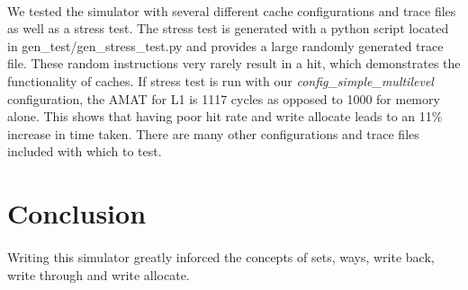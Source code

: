 \documentclass[11pt]{article}
\begin{document}
\paragraph{}
We tested the simulator with several different cache configurations and trace files as well as a stress test. The stress test is generated with a python script located in gen\_test/gen\_stress\_test.py and provides a large randomly generated trace file. These random instructions very rarely result in a hit, which demonstrates the functionality of caches. If stress test is run with our \textit{config\_simple\_multilevel} configuration, the AMAT for L1 is 1117 cycles as opposed to 1000 for memory alone. This shows that having poor hit rate and write allocate leads to an 11\% increase in time taken. There are many other configurations and trace files included with which to test. 

\section{Conclusion}
\paragraph{}
Writing this simulator greatly inforced the concepts of sets, ways, write back, write through and write allocate. 
\end{document}

